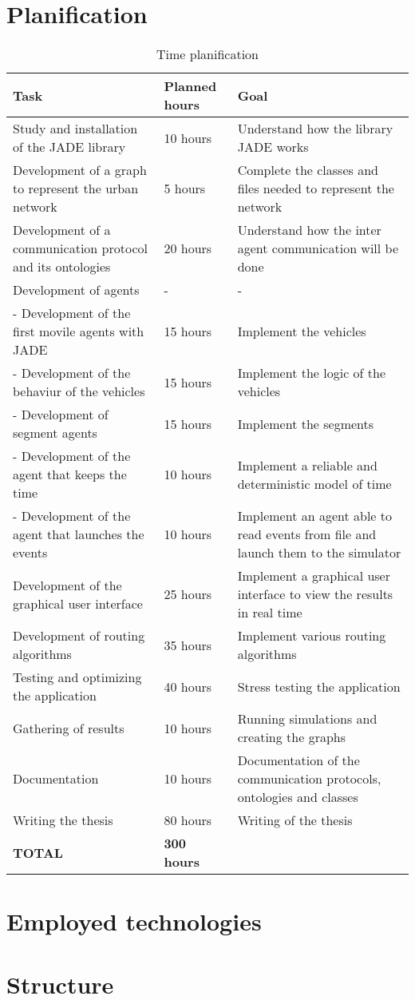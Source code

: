 \section{Planification}

\begin{table}[H]
\centering
\begin{tabularx}{\textwidth}{|X|l|X|}
\hline 
\textbf{Task} & \textbf{Planned hours} & \textbf{Goal} \\ 
\hline 
Study and installation of the JADE library & 10 hours & Understand how the library JADE works \\ 
\hline 
Development of a graph to represent the urban network & 5 hours & Complete the classes and files needed to represent the network \\ 
\hline 
Development of a communication protocol and its ontologies & 20 hours & Understand how the inter agent communication will be done \\ 
\hline 
Development of agents & - & - \\ 
\hline 
- Development of the first movile agents with JADE & 15 hours & Implement the vehicles \\ 
\hline 
- Development of the behaviur of the vehicles & 15 hours & Implement the logic of the vehicles \\ 
\hline 
- Development of segment agents & 15 hours & Implement the segments \\ 
\hline 
- Development of the agent that keeps the time & 10 hours & Implement a reliable and deterministic model of time \\ 
\hline 
- Development of the agent that launches the events & 10 hours & Implement an agent able to read events from file and launch them to the simulator \\ 
\hline 
Development of the graphical user interface & 25 hours & Implement a graphical user interface to view the results in real time \\ 
\hline 
Development of routing algorithms & 35 hours & Implement various routing algorithms \\ 
\hline 
Testing and optimizing the application & 40 hours & Stress testing the application \\ 
\hline 
Gathering of results & 10 hours & Running simulations and creating the graphs \\ 
\hline 
Documentation & 10 hours & Documentation of the communication protocols, ontologies and classes \\ 
\hline 
Writing the thesis & 80 hours & Writing of the thesis \\ 
\hline 
\textbf{TOTAL} & \textbf{300 hours} &  \\ 
\hline 
\end{tabularx}
\caption{Time planification}
\end{table}

\section{Employed technologies}



\section{Structure}

